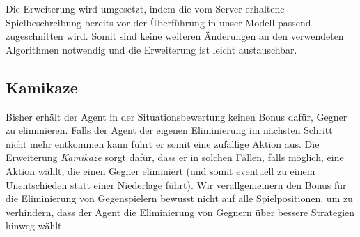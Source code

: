 Die Erweiterung wird umgesetzt, indem die vom Server erhaltene Spielbeschreibung bereits vor der Überführung in unser Modell passend zugeschnitten wird. Somit sind keine weiteren Änderungen an den verwendeten Algorithmen notwendig und die Erweiterung ist leicht austauschbar.

\subsection{Kamikaze}
Bisher erhält der Agent in der Situationsbewertung keinen Bonus dafür, Gegner zu eliminieren. Falls der Agent der eigenen Eliminierung im nächsten Schritt nicht mehr entkommen kann führt er somit eine zufällige Aktion aus. Die Erweiterung \textit{Kamikaze} sorgt dafür, dass er in solchen Fällen, falls möglich, eine Aktion wählt, die einen Gegner eliminiert (und somit eventuell zu einem Unentschieden statt einer Niederlage führt). Wir verallgemeinern den Bonus für die Eliminierung von Gegenspielern bewusst nicht auf alle Spielpositionen, um zu verhindern, dass der Agent die Eliminierung von Gegnern über bessere Strategien hinweg wählt.
